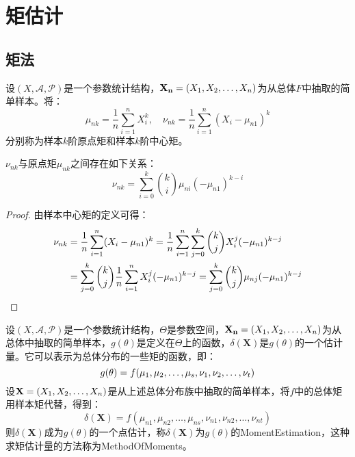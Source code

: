 \section{矩估计}

\subsection{矩法}
\begin{definition}
	设$(X,\mathscr{A},\mathscr{P})$是一个参数统计结构，$\mathbf{X_n}=(X_1, X_2, \dots, X_{n})$为从总体$F$中抽取的简单样本。将：
	\begin{equation*}
		\mu_{nk}=\frac{1}{n}\sum_{i=1}^{n}X_i^k,\quad
		\nu_{nk}=\frac{1}{n}\sum_{i=1}^{n}(X_i-\mu_{n1})^k
	\end{equation*}
	分别称为样本$k$阶原点矩和样本$k$阶中心矩。
\end{definition}
\begin{theorem}\label{theo:SampleMoment}
	$\nu_{nk}$与原点矩$\mu_{nk}$之间存在如下关系：
	\begin{equation*}
		\nu_{nk}=\sum_{i=0}^{k}\binom{k}{i}\mu_{ni}(-\mu_{n1})^{k-i}
	\end{equation*}
\end{theorem}
\begin{proof}
	由样本中心矩的定义可得：
	\begin{align*}
		\nu_{nk}
		&=\frac{1}{n}\sum_{i=1}^{n}(X_i-\mu_{n1})^k
		=\frac{1}{n}\sum_{i=1}^{n}\sum_{j=0}^{k}\binom{k}{j}X_i^j(-\mu_{n1})^{k-j} \\
		&=\sum_{j=0}^{k}\binom{k}{j}\frac{1}{n}\sum_{i=1}^{n}X_i^j(-\mu_{n1})^{k-j}
		=\sum_{j=0}^{k}\binom{k}{j}\mu_{nj}(-\mu_{n1})^{k-j}\qedhere
	\end{align*}
\end{proof}
\begin{definition}
	设$(X,\mathscr{A},\mathscr{P})$是一个参数统计结构，$\Theta$是参数空间，$\mathbf{X_n}=(X_1, X_2, \dots, X_{n})$为从总体中抽取的简单样本，$g(\theta)$是定义在$\Theta$上的函数，$\delta(\mathbf{X})$是$g(\theta)$的一个估计量。它可以表示为总体分布的一些矩的函数，即：
	\begin{equation*}
		g(\theta)=f(\mu_1, \mu_2, \dots, \mu_{s},\nu_1, \nu_2, \dots, \nu_{t})
	\end{equation*}
	设$\mathbf{X}=(X_1, X_2, \dots, X_{n})$是从上述总体分布族中抽取的简单样本，将$f$中的总体矩用样本矩代替，得到：
	\begin{equation*}
		\delta(\mathbf{X})=f(\mu_{n1},\mu_{n2},\dots,\mu_{ns},\nu_{n1},\nu_{n2},\dots,\nu_{nt})
	\end{equation*}
	则$\delta(\mathbf{X})$成为$g(\theta)$的一个点估计，称$\delta(\mathbf{X})$为$g(\theta)$的\gls{MomentEstimation}，这种求矩估计量的方法称为\gls{MethodOfMoments}。
\end{definition}

